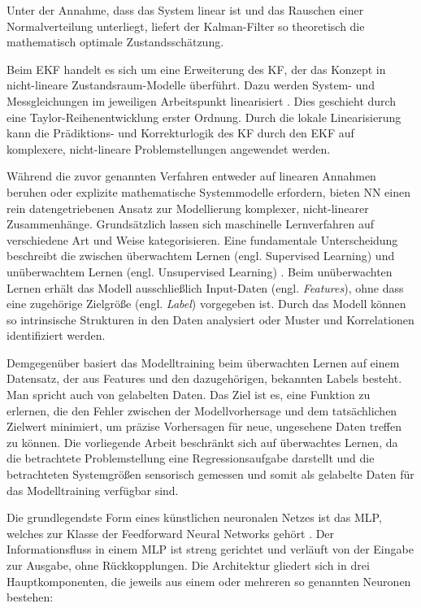 %
Unter der Annahme, dass das System linear ist und das Rauschen einer Normalverteilung unterliegt, liefert der Kalman-Filter so theoretisch die mathematisch optimale Zustandsschätzung.\par
Beim \ac{EKF} handelt es sich um eine Erweiterung des \ac{KF}, der das Konzept in nicht-lineare Zustandsraum-Modelle überführt. Dazu werden System- und Messgleichungen im jeweiligen Arbeitspunkt linearisiert \cite{welch.1995}. Dies geschieht durch eine Taylor-Reihenentwicklung erster Ordnung. Durch die lokale Linearisierung kann die Prädiktions- und Korrekturlogik des \ac{KF} durch den \ac{EKF} auf komplexere, nicht-lineare Problemstellungen angewendet werden. \par
Während die zuvor genannten Verfahren entweder auf linearen Annahmen beruhen oder explizite mathematische Systemmodelle erfordern, bieten \ac{NN} einen rein datengetriebenen Ansatz zur Modellierung komplexer, nicht-linearer Zusammenhänge. 
Grundsätzlich lassen sich maschinelle Lernverfahren auf verschiedene Art und Weise kategorisieren. Eine fundamentale Unterscheidung beschreibt die zwischen überwachtem Lernen (engl. Supervised Learning) und unüberwachtem Lernen (engl. Unsupervised Learning) \cite{bishop.2006}.
Beim unüberwachten Lernen erhält das Modell ausschließlich Input-Daten (engl. \emph{Features}), ohne dass eine zugehörige Zielgröße (engl. \emph{Label}) vorgegeben ist. Durch das Modell können so intrinsische Strukturen in den Daten analysiert oder Muster und Korrelationen identifiziert werden. \par
Demgegenüber basiert das Modelltraining beim überwachten Lernen auf einem Datensatz, der aus Features und den dazugehörigen, bekannten Labels besteht. Man spricht auch von gelabelten Daten. Das Ziel ist es, eine Funktion zu erlernen, die den Fehler zwischen der Modellvorhersage und dem tatsächlichen Zielwert minimiert, um präzise Vorhersagen für neue, ungesehene Daten treffen zu können. Die vorliegende Arbeit beschränkt sich auf überwachtes Lernen, da die betrachtete Problemstellung eine Regressionsaufgabe darstellt und die betrachteten Systemgrößen sensorisch gemessen und somit als gelabelte Daten für das Modelltraining verfügbar sind. \par
Die grundlegendste Form eines künstlichen neuronalen Netzes ist das \ac{MLP}, welches zur Klasse der Feedforward Neural Networks gehört \cite{goodfellow.2016}. Der Informationsfluss in einem \ac{MLP} ist streng gerichtet und verläuft von der Eingabe zur Ausgabe, ohne Rückkopplungen.
Die Architektur gliedert sich in drei Hauptkomponenten, die jeweils aus einem oder mehreren so genannten Neuronen bestehen:
